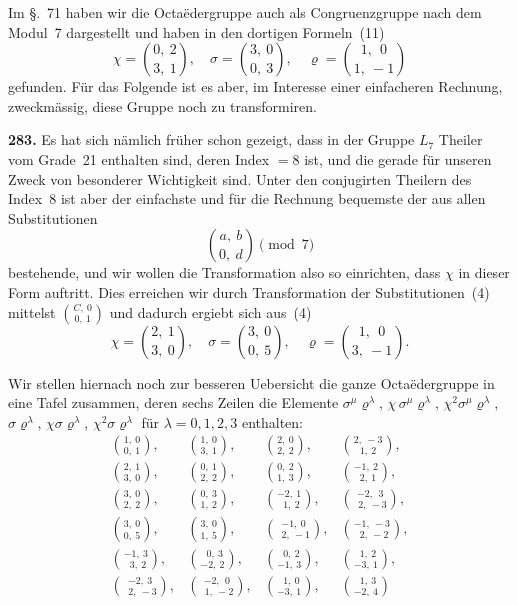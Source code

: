 \documentclass[12pt,a4paper]{article}
\begin{document}
Im \S.~71 haben wir die Octa\"edergruppe auch als Congruenzgruppe nach dem Modul~7 dargestellt und haben in den dortigen Formeln~(11)
\[
\chi = \binom{0,\ 2}{3,\ 1},\quad \sigma = \binom{3,\ 0}{0,\ 3},\quad \varrho = \binom{1,\ \ 0}{1,\ -1}
\]
gefunden. F\"ur das Folgende ist es aber, im Interesse einer einfacheren Rechnung, zweckm\"assig, diese Gruppe noch zu transformiren.

\bigskip
\noindent\textbf{283.} Es hat sich n\"amlich fr\"uher schon gezeigt, dass in der Gruppe $L_7$ Theiler vom Grade~21 enthalten sind, deren Index ${}=8$ ist, und die gerade f\"ur unseren Zweck von besonderer Wichtigkeit sind. Unter den conjugirten Theilern des Index~8 ist aber der einfachste und f\"ur die Rechnung bequemste der aus allen Substitutionen
\begin{equation}
\binom{a,\ b}{0,\ d} \pmod 7
\tag{4}
\end{equation}
bestehende, und wir wollen die Transformation also so einrichten, dass $\chi$ in dieser Form auftritt. Dies erreichen wir durch Transformation der Substitutionen~(4) mittelst $\binom{C,\ 0}{0,\ 1}$ und dadurch ergiebt sich aus~(4)
\[
\chi = \binom{2,\ 1}{3,\ 0},\quad \sigma = \binom{3,\ 0}{0,\ 5},\quad \varrho = \binom{1,\ \ 0}{3,\ -1}.
\]

Wir stellen hiernach noch zur besseren Uebersicht die ganze Octa\"edergruppe in eine Tafel zusammen, deren sechs Zeilen die Elemente $\sigma^{\mu}\varrho^{\lambda}$, $\chi\,\sigma^{\mu}\varrho^{\lambda}$, $\chi^2\sigma^{\mu}\varrho^{\lambda}$, $\sigma\varrho^{\lambda}$, $\chi\sigma\varrho^{\lambda}$, $\chi^2\sigma\varrho^{\lambda}$ f\"ur $\lambda = 0,1,2,3$ enthalten:
\[
\begin{array}{cccc}
\binom{1,\ 0}{0,\ 1},&
\binom{1,\ 0}{3,\ 1},&
\binom{2,\ 0}{2,\ 2},&
\binom{2,\ -3}{1,\ 2},\\[6pt]
\binom{2,\ 1}{3,\ 0},&
\binom{0,\ 1}{2,\ 2},&
\binom{0,\ 2}{1,\ 3},&
\binom{-1,\ 2}{\ \ 2,\ 1},\\[6pt]
\binom{3,\ 0}{2,\ 2},&
\binom{0,\ 3}{1,\ 2},&
\binom{-2,\ 1}{\ \ 1,\ 2},&
\binom{-2,\ \ 3}{\ \ 2,\ -3},\\[6pt]
\binom{3,\ 0}{0,\ 5},&
\binom{3,\ 0}{1,\ 5},&
\binom{-1,\ 0}{\ \ 2,\ -1},&
\binom{-1,\ -3}{\ \ 2,\ -2},\\[6pt]
\binom{-1,\ 3}{\ \ 3,\ 2},&
\binom{\ \ 0,\ 3}{-2,\ 2},&
\binom{\ \ 0,\ 2}{-1,\ 3},&
\binom{\ \ 1,\ 2}{-3,\ 1},\\[6pt]
\binom{-2,\ 3}{\ \ 2,\ -3},&
\binom{-2,\ \ 0}{\ \ 1,\ -2},&
\binom{\ \ 1,\ 0}{-3,\ 1},&
\binom{\ \ 1,\ 3}{-2,\ 4}
\end{array}
\]
\end{document}
